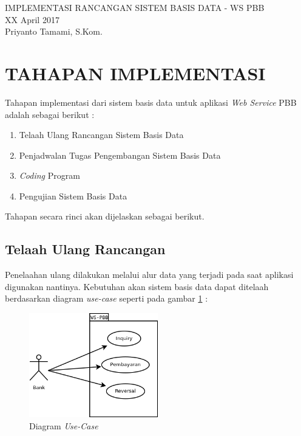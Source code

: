 \documentclass[pdftex,12pt, oneside]{article}
\begin{document}
\sloppy %

\begin{center}
{\large IMPLEMENTASI RANCANGAN SISTEM BASIS DATA - WS PBB}
\\[1cm]
XX April 2017\\
Priyanto Tamami, S.Kom.
\end{center}




\section{TAHAPAN IMPLEMENTASI}

Tahapan implementasi dari sistem basis data untuk aplikasi \textit{Web Service} PBB adalah sebagai berikut :

\begin{enumerate}[1.]
  \item Telaah Ulang Rancangan Sistem Basis Data
  \item Penjadwalan Tugas Pengembangan Sistem Basis Data
  \item \textit{Coding} Program
  \item Pengujian Sistem Basis Data
\end{enumerate}

Tahapan secara rinci akan dijelaskan sebagai berikut.

\subsection{Telaah Ulang Rancangan}

Penelaahan ulang dilakukan melalui alur data yang terjadi pada saat aplikasi digunakan nantinya. Kebutuhan akan sistem basis data dapat ditelaah berdasarkan diagram \textit{use-case} seperti pada gambar \ref{fig:use-case} :

\begin{figure}[H]
	\centering
	\includegraphics[width=0.5\textwidth]{./resources/001-uml-use-case}
	\caption{Diagram \textit{Use-Case}}
	\label{fig:use-case}
\end{figure}
\end{document}
